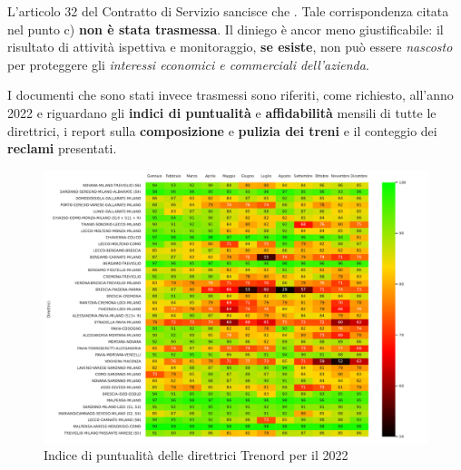\documentclass[12pt,a4paper,italian]{report}
\begin{document}
L'articolo 32 del Contratto di Servizio sancisce che
.  Tale corrispondenza citata nel punto c) \textbf{non
    è stata trasmessa}.  Il diniego è ancor meno giustificabile: il
risultato di attività ispettiva e monitoraggio, \textbf{se esiste},
non può essere \textit{nascosto} per proteggere gli \textit{interessi
    economici e commerciali dell'azienda}.

I documenti che sono stati invece trasmessi sono riferiti, come
richiesto, all'anno 2022 e riguardano gli \textbf{indici di
    puntualità} e \textbf{affidabilità} mensili di tutte le
direttrici, i report sulla \textbf{composizione} e \textbf{pulizia dei
    treni} e il conteggio dei \textbf{reclami} presentati.

\begin{figure}
    \centering
    \includegraphics[width=1\textwidth]{images/lomb_heatmap.pdf}
    \caption{Indice di puntualità delle direttrici Trenord per il
        2022}
    \label{figure:lomb_heatmap}
\end{figure}
\end{document}
